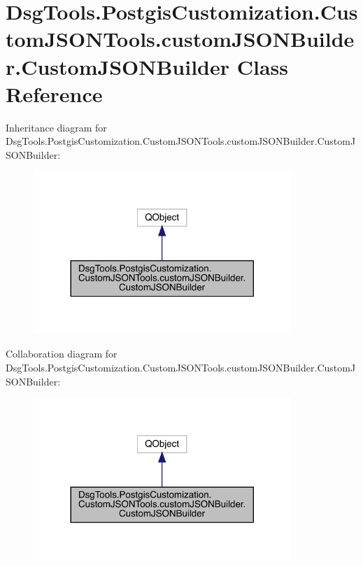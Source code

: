 \hypertarget{class_dsg_tools_1_1_postgis_customization_1_1_custom_j_s_o_n_tools_1_1custom_j_s_o_n_builder_1_1_custom_j_s_o_n_builder}{}\section{Dsg\+Tools.\+Postgis\+Customization.\+Custom\+J\+S\+O\+N\+Tools.\+custom\+J\+S\+O\+N\+Builder.\+Custom\+J\+S\+O\+N\+Builder Class Reference}
\label{class_dsg_tools_1_1_postgis_customization_1_1_custom_j_s_o_n_tools_1_1custom_j_s_o_n_builder_1_1_custom_j_s_o_n_builder}


Inheritance diagram for Dsg\+Tools.\+Postgis\+Customization.\+Custom\+J\+S\+O\+N\+Tools.\+custom\+J\+S\+O\+N\+Builder.\+Custom\+J\+S\+O\+N\+Builder\+:
\nopagebreak
\begin{figure}[H]
\begin{center}
\leavevmode
\includegraphics[width=276pt]{class_dsg_tools_1_1_postgis_customization_1_1_custom_j_s_o_n_tools_1_1custom_j_s_o_n_builder_1_1360f7e2c6060b36eda80c1fdc07a4b99}
\end{center}
\end{figure}


Collaboration diagram for Dsg\+Tools.\+Postgis\+Customization.\+Custom\+J\+S\+O\+N\+Tools.\+custom\+J\+S\+O\+N\+Builder.\+Custom\+J\+S\+O\+N\+Builder\+:
\nopagebreak
\begin{figure}[H]
\begin{center}
\leavevmode
\includegraphics[width=276pt]{class_dsg_tools_1_1_postgis_customization_1_1_custom_j_s_o_n_tools_1_1custom_j_s_o_n_builder_1_15ef2ef1054c5254c37331468314f6692}
\end{center}
\end{figure}
